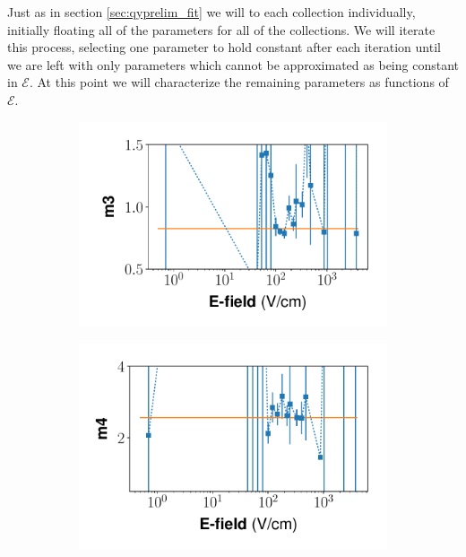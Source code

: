Just as in section \ref{sec:qyprelim_fit} we will to each collection individually, initially floating all of the parameters for all of the collections. We will iterate this process, selecting one parameter to hold constant after each iteration until we are left with only parameters which cannot be approximated as being constant in $\mathcal{E}$. At this point we will characterize the remaining parameters as functions of $\mathcal{E}$. 
\begin{figure}[!h]
\centering
\begin{subfigure}{0.33\linewidth}
  \includegraphics[width=\textwidth]{Figures/Yields_fit_new/NEST_m3_fit_new.pdf}
  \caption{}
\end{subfigure}%
\begin{subfigure}{0.33\linewidth}
  \includegraphics[width=\textwidth]{Figures/Yields_fit_new/NEST_m4_fit_new.pdf}
  \caption{}
\end{subfigure}%

\end{figure}
